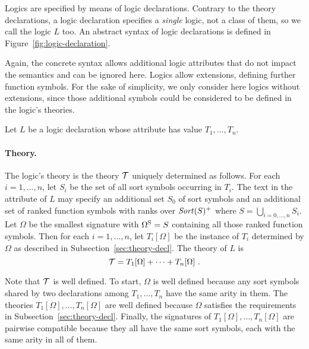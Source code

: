 Logics are specified by means of logic declarations.
Contrary to the theory declarations, 
a logic declaration specifies a \emph{single} logic, 
not a class of them,
so we call the logic $L$ too.
An abstract syntax of logic declarations is defined in 
Figure~\ref{fig:logic-declaration}.
\begin{newver}  
Again, the concrete syntax allows additional logic attributes
that do not impact the semantics and can be ignored here.
Logics allow extensions, defining further function symbols.
For the sake of simplicity, we only 
consider here logics without extensions, since those additional
symbols could be considered to be defined in the logic's theories.
\end{newver}

Let $L$ be a logic declaration whose  attribute has value
$T_1, \ldots, T_n$.

\paragraph{Theory.}
The logic's theory is the theory $\mathcal{T}$ uniquely determined as follows.
For each $i=1,\ldots,n$,
let $S_i$ be the set of all sort symbols occurring in $T_i$.
The text in the  attribute of $L$ may specify
an additional set $S_0$ of sort symbols and 
an additional set of ranked function symbols with ranks over $\mathit{Sort}(S)^+$
where $S = \bigcup_{i=0,\ldots,n} S_i$.
Let $\Omega$ be the smallest signature with $\Omega^\mathrm{S} = S$
containing all those ranked function symbols.
Then for each $i=1,\ldots,n$, 
let $T_i[\Omega]$ be the instance of $T_i$ determined by $\Omega$ 
as described in Subsection~\ref{sec:theory-decl}.
The theory of $L$ is 
\[
 \T = T_1[\Omega] + \cdots + T_n[\Omega]\ .
\]

Note that $\mathcal{T}$ is well defined.
To start, $\Omega$ is well defined 
because any sort symbols shared by two declarations among
$T_1, \ldots, T_n$ have the same arity in them.
The theories $T_1[\Omega], \ldots, T_n[\Omega]$ are well defined 
because $\Omega$ satisfies the requirements in Subsection~\ref{sec:theory-decl}.
Finally, 
the signatures of $T_1[\Omega], \ldots, T_n[\Omega]$ are pairwise compatible
because they all have the same sort symbols, 
each with the same arity in all of them.

 

